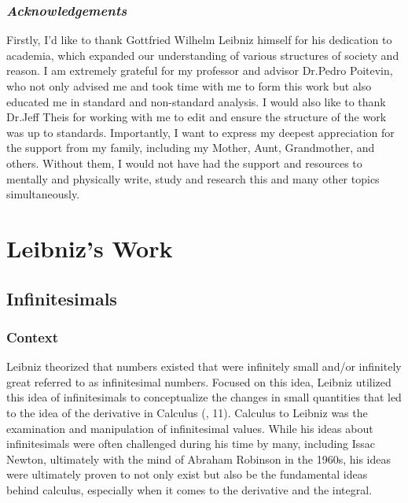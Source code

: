 \documentclass[12pt]{report}
\begin{document}
\section*{\textit{Acknowledgements}}
\begin{itshape}
    Firstly, I'd like to thank Gottfried Wilhelm Leibniz himself for his dedication to academia, which expanded our understanding of various structures of society and reason.\newline \newline
    I am extremely grateful for my professor and advisor Dr.Pedro Poitevin, who not only advised me and took time with me to form this work but also educated me in standard and non-standard analysis.\newline\newline
    I would also like to thank Dr.Jeff Theis for working with me to edit and ensure the structure of the work was up to standards.\newline \newline
    Importantly, I want to express my deepest appreciation for the support from my family, including my Mother, Aunt, Grandmother, and others.
    Without them, I would not have had the support and resources to mentally and physically write, study and research this and many other topics simultaneously.
\end{itshape}
\newpage
{}
\part{Leibniz's Work}
\newpage

\chapter{Infinitesimals}

    \section*{Context}
Leibniz theorized that numbers existed that were infinitely small and/or infinitely great referred to as infinitesimal numbers.
Focused on this idea, Leibniz utilized this idea of infinitesimals to conceptualize the changes in small quantities that led to the idea of the derivative in Calculus (, 11).
Calculus to Leibniz was the examination and manipulation of infinitesimal values.
While his ideas about infinitesimals were often challenged during his time by many, including Issac Newton, ultimately with the mind of Abraham Robinson in the 1960s, his ideas were ultimately proven to not only exist but also be the fundamental ideas behind calculus, especially when it comes to the derivative and the integral.
\end{document}
